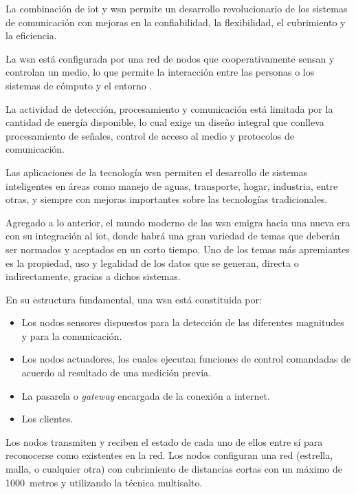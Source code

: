 La combinación de \gls{iot} y \gls{wsn} permite un desarrollo revolucionario de los sistemas de comunicación con mejoras en la confiabilidad, la flexibilidad, el cubrimiento y la eficiencia.

La \gls{wsn} está configurada por una red de nodos que cooperativamente sensan y controlan un medio, lo que permite la interacción entre las personas o los sistemas de cómputo y el entorno \cite{Akyildiz-2002}.

La actividad de detección, procesamiento y comunicación está limitada por la cantidad de energía disponible, lo cual exige un diseño integral que conlleva procesamiento de señales, control de acceso al medio y protocolos de comunicación.

Las aplicaciones de la tecnología \gls{wsn} permiten el desarrollo de sistemas inteligentes en áreas como manejo de aguas, transporte, hogar, industria, entre otras, y siempre con mejoras importantes sobre las tecnologías tradicionales.

Agregado a lo anterior, el mundo moderno de las \gls{wsn} emigra hacia una nueva era con su integración al \gls{iot}, donde habrá una gran variedad de temas que deberán ser normados y aceptados en un corto tiempo. Uno de los temas más apremiantes es la propiedad, uso y legalidad de los datos que se generan, directa o indirectamente, gracias a dichos sistemas.

En su estructura fundamental, una \gls{wsn} está constituida por:
\begin{itemize}
  \item Los nodos sensores dispuestos para la detección de las diferentes magnitudes y para la comunicación.
  \item Los nodos actuadores, los cuales ejecutan funciones de control comandadas de acuerdo al resultado de una medición previa.
  \item La pasarela o \emph{gateway} encargada de la conexión a internet.
  \item Los clientes.
\end{itemize}

Los nodos transmiten y reciben el estado de cada uno de ellos entre sí para reconocerse como existentes en la red. Los nodos configuran una red (estrella, malla, o cualquier otra) con cubrimiento de distancias cortas con un máximo de 1000~metros y utilizando la técnica multisalto.
